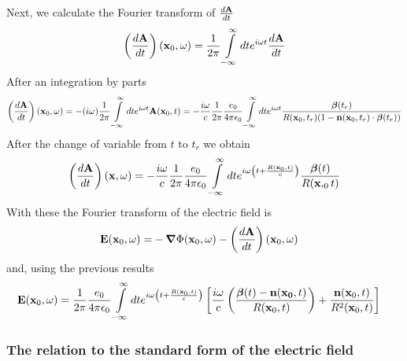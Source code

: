 Next, we calculate the Fourier transform of $\frac{d{\bf A}}{dt}$
\begin{align}
    \left(\frac{d{\bf A}}{dt}\right)({\bf x}_0,\omega)=\frac1{2\pi}\int\limits_{-\infty}^{\infty}dt e^{i\omega t}\frac{d{\bf A}}{dt}
\end{align}
After an integration by parts
\begin{align}
    \left(\frac{d{\bf A}}{dt}\right)({\bf x}_0,\omega)=-(i\omega)\frac1{2\pi}\int\limits_{-\infty}^{\infty}dt e^{i\omega t}{\bf A}({\bf x}_0,t)=-\frac{i\omega}c\frac1{2\pi}\frac{e_0}{4\pi\epsilon_0}\int\limits_{-\infty}^{\infty}dte^{i\omega t}\frac{{\boldsymbol{\beta}}(t_r)}{R({\bf x}_0,t_r)(1-{\bf n}({\bf x}_0,t_r)\cdot{\boldsymbol{\beta}}(t_r))}
\end{align}
After the change of variable from $t$ to $t_r$ we obtain
\begin{align}
    \left(\frac{d{\bf A}}{dt}\right)({\bf x},\omega)=-\frac{i\omega}c\frac1{2\pi}\frac{e_0}{4\pi\epsilon_0}\int\limits_{-\infty}^{\infty}dt e^{i\omega \left(t+\frac{R({\bf x}_0,t)}{c}\right)}\frac{{\boldsymbol{\beta}}(t)}{R({\bf x},_0t)}
\end{align}
With these the Fourier transform of the electric field is
\begin{align}
    {\bf E}({\bf x}_0,\omega)= & -{\boldsymbol{\nabla}}\Phi({\bf x}_0,\omega)-\left(\frac{d{\bf A}}{dt}\right)({\bf x}_0,\omega)
\end{align}
and, using the previous results
\begin{align}
    {\bf E}({\bf x}_0,\omega) & =\frac1{2\pi}\frac{e_0}{4\pi\epsilon_0}\int\limits_{-\infty}^{\infty}dte^{i\omega\left( t+\frac{R({\bf x}_0,t)}{c}\right)}\left[\frac{i\omega}c\left(\frac{{\boldsymbol{\beta}}(t)-{\bf n}({\bf x_0},t)}{R({\bf x}_0,t)}\right)+\frac{{\bf n}({\bf x}_0,t)}{R^2({\bf x}_0,t)}\right]
\end{align}

\subsubsection{The relation to the standard form of the electric field}

